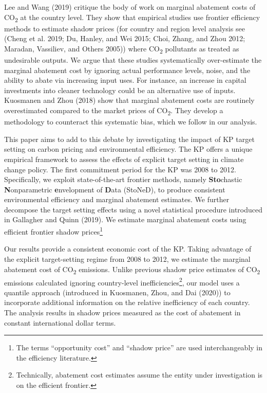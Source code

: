 \documentclass[
  10pt,
]{article}
\begin{document}
Lee and Wang (2019) critique the body of work on marginal abatement
costs of CO\textsubscript{2} at the country level. They show that
empirical studies use frontier efficiency methods to estimate shadow
prices (for country and region level analysis see (Cheng et al. 2019;
Du, Hanley, and Wei 2015; Choi, Zhang, and Zhou 2012; Maradan,
Vassiliev, and Others 2005)) where CO\textsubscript{2} pollutants as
treated as undesirable outputs. We argue that these studies
systematically over-estimate the marginal abatement cost by ignoring
actual performance levels, noise, and the ability to abate via
increasing input uses. For instance, an increase in capital investments
into cleaner technology could be an alternative use of inputs. Kuosmanen
and Zhou (2018) show that marginal abatement costs are routinely
overestimated compared to the market prices of CO\textsubscript{2}. They
develop a methodology to counteract this systematic bias, which we
follow in our analysis.

This paper aims to add to this debate by investigating the impact of KP
target setting on carbon pricing and environmental efficiency.  The KP offers a unique empirical framework to assess the effects of
explicit target setting in climate change policy. The first commitment
period for the KP was 2008 to 2012. 
Specifically, we exploit state-of-the-art frontier methods, namely
\textbf{Sto}chastic \textbf{N}onparametric \textbf{e}nvelopment of
\textbf{D}ata (StoNeD), to produce consistent environmental efficiency
and marginal abatement estimates. We further decompose the target
setting effects using a novel statistical procedure introduced in
Gallagher and Quinn (2019). We estimate marginal abatement costs using
efficient frontier shadow prices\footnote{The terms ``opportunity cost''
  and ``shadow price'' are used interchangeably in the efficiency
  literature.}

Our results provide a consistent economic cost of the KP. Taking
advantage of the explicit target-setting regime from 2008 to 2012, we
estimate the marginal abatement cost of CO\textsubscript{2} emissions.
Unlike previous shadow price estimates of CO\textsubscript{2} emissions
calculated ignoring country-level inefficiencies\footnote{Technically,
  abatement cost estimates assume the entity under investigation is on
  the efficient frontier.}, our model uses a quantile approach (introduced in Kuosmanen, Zhou, and Dai (2020)) to
incorporate additional information on the relative inefficiency of each
country. The analysis results in shadow prices measured as the cost of
abatement in constant international dollar terms.
\end{document}
